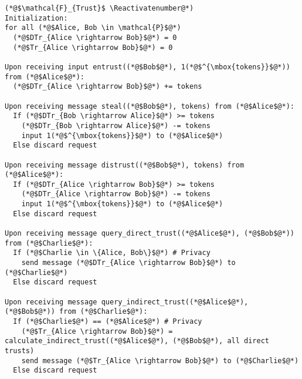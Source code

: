 \Suppressnumber
\begin{lstlisting}[label=trustfunc, style=numbers]
(*@$\mathcal{F}_{Trust}$ \Reactivatenumber@*)
Initialization:
for all (*@$Alice, Bob \in \mathcal{P}$@*)
  (*@$DTr_{Alice \rightarrow Bob}$@*) = 0
  (*@$Tr_{Alice \rightarrow Bob}$@*) = 0

Upon receiving input entrust((*@$Bob$@*), 1(*@$^{\mbox{tokens}}$@*)) from (*@$Alice$@*):
  (*@$DTr_{Alice \rightarrow Bob}$@*) += tokens

Upon receiving message steal((*@$Bob$@*), tokens) from (*@$Alice$@*):
  If (*@$DTr_{Bob \rightarrow Alice}$@*) >= tokens
    (*@$DTr_{Bob \rightarrow Alice}$@*) -= tokens
    input 1(*@$^{\mbox{tokens}}$@*) to (*@$Alice$@*)
  Else discard request

Upon receiving message distrust((*@$Bob$@*), tokens) from (*@$Alice$@*):
  If (*@$DTr_{Alice \rightarrow Bob}$@*) >= tokens
    (*@$DTr_{Alice \rightarrow Bob}$@*) -= tokens
    input 1(*@$^{\mbox{tokens}}$@*) to (*@$Alice$@*)
  Else discard request

Upon receiving message query_direct_trust((*@$Alice$@*), (*@$Bob$@*)) from (*@$Charlie$@*):
  If (*@$Charlie \in \{Alice, Bob\}$@*) # Privacy
    send message (*@$DTr_{Alice \rightarrow Bob}$@*) to (*@$Charlie$@*)
  Else discard request

Upon receiving message query_indirect_trust((*@$Alice$@*), (*@$Bob$@*)) from (*@$Charlie$@*):
  If (*@$Charlie$@*) == (*@$Alice$@*) # Privacy
    (*@$Tr_{Alice \rightarrow Bob}$@*) = calculate_indirect_trust((*@$Alice$@*), (*@$Bob$@*), all direct trusts)
    send message (*@$Tr_{Alice \rightarrow Bob}$@*) to (*@$Charlie$@*)
  Else discard request
\end{lstlisting}
